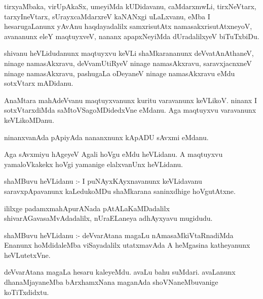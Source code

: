 \documentclass{article}
\begin{document}
\begin{mn}
tirxyaMbaka,  virUpAkaSx,  umeyiMda  kUDidavanu,  caMdarxmwLi,  tirxNeVtarx,  tarxyIneVtarx,  sUrayxcaMdarxreV  
kaNANxgi  uLaLxvanu,  eMba  I  hesarugaLanunx  yAvAnu  haqdayadalilx  samxrisutAtx  namasakxrisutAtxneyoV,  
avananunx  eleY  maqtuyxveV,  nananx  apapxNeyiMda  dUradalilxyeV  biTuTxbiDu.
\end{mn}

\begin{mn}
shivanu  heVLidudanunx  maqtuyxvu  keVLi  shaMkarananunx  deVvatAnAthaneV,  ninage  namasAkxravu,  deVvamUtiRyeV  ninage  
namasAkxravu,  saravxjacnxneV  ninage  namasAkxravu,  pashugaLa  oDeyaneV  ninage  namasAkxravu  eMdu  sotxVtarx  mADidanu.
\end{mn}

\begin{mn}
AnaMtara  mahAdeVvanu  maqtuyxvanunx  kuritu  varavanunx  keVLikoV.  ninanx  I  sotxVtarxdiMda  saMtoVSagoMDidedxVne  
eMdanu.  Aga  maqtuyxvu  varavanunx  keVLikoMDanu.
\end{mn}

\begin{mn}
ninanxvanAda  pApiyAda  nananxnunx  kApADU  sAvxmi  eMdanu.
\end{mn}

\begin{mn}
Aga  sAvxmiyu  hAgeyeV  Agali  hoVgu  eMdu  heVLidanu.  A  maqtuyxvu  yamaloVkakekx  hoVgi  yamanige  elalxvanUnx  heVLidanu.
\end{mn}

\begin{mn}
shaMBuvu  heVLidanu :- I  puNAyxKAyxnavanunx  keVLidavanu  saravxpApavanunx  kaLedukoMDu  shaMkarana  saninxdhige  hoVgutAtxne.
\end{mn}

\begin{mn}
ililxge  padamxmahApurANada  pAtALaKaMDadalilx  shivarAGavasaMvAdadalilx,  nUraELaneya  adhAyxyavu  mugidudu.
\end{mn}




\begin{mn}
shaMBuvu  heVLidanu :- deVvarAtana  magaLu  nAmasaMkiVtaRnadiMda  Enanunx  hoMdidaleMba  viSayadalilx  
utatxmavAda  A  heMgasina  katheyanunx  heVLutetxVne.
\end{mn}

\begin{mn}
deVvarAtana  magaLa  hesaru  kaleyeMdu.  avaLu  bahu  suMdari.  avaLanunx  dhanaMjayaneMba  bArxhamxNana  
maganAda  shoVNaneMbuvanige  koTiTxdidxtu.
\end{mn}
\end{document}
